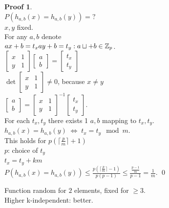 \documentclass[a4paper, 12pt]{book}
\theoremstyle{definition}
\newtheorem{pro}[counter]{Proof}
\theoremstyle{remark}
\newcommand{\Z}{\mathbb{Z}}
\begin{document}
\begin{pro} \text{} \\
  $P(h_{a,b}(x) = h_{a,b}(y)) = ?$ \\
  $x, y$ fixed. \\
  For any $a, b$ denote \\
  $ax + b = t_x \\
  ay + b = t_y: \\
  a \sqcup + b \in \Z_p$. \\
  $\begin{bmatrix}x & 1 \\ y & 1\end{bmatrix} \begin{bmatrix}a \\b\end{bmatrix} =
  \begin{bmatrix}t_x \\ t_y\end{bmatrix}$ \\
  $\det \begin{bmatrix}x & 1 \\ y & 1\end{bmatrix} \neq 0$, because $x \neq y$ \\
  $\begin{bmatrix}a \\b\end{bmatrix} = \begin{bmatrix}x & 1 \\ y & 1\end{bmatrix}^{-1}
  \begin{bmatrix}t_x \\ t_y\end{bmatrix}$. \\
  For each $t_x, t_y$ there exists 1 $a, b$ mapping to $t_x, t_y$. \\
  $h_{a,b}(x) = h_{a,b}(y) \; \iff \; t_x = t_y \mod m$. \\
  This holds for $p\left(\lceil\frac{p}{m}\rceil + 1\right)$ \\
  $p$: choice of $t_y$ \\
  $t_x = t_y + km$ \\
  $P\left(h_{a,b}(x) = h_{a,b}(y)\right) \leq \frac{p\left(\lceil\frac{p}{m}\rceil-1\right)}{p(p-1)}
  \leq \frac{\frac{p-1}{m}}{p-1} = \frac{1}{m}$.
  \qed
\end{pro}
Function random for $2$ elements, fixed for $\geq 3$. \\
Higher k-independent: better.
\end{document}
